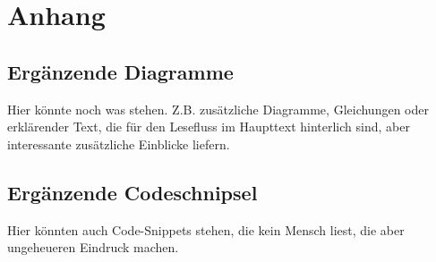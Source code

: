 \chapter{Anhang}

\section{Ergänzende Diagramme}
\label{Anhang_Diagramme}

Hier könnte noch was stehen. Z.B. zusätzliche Diagramme, Gleichungen
oder erklärender Text, die für den Lesefluss im Haupttext hinterlich
sind, aber interessante zusätzliche Einblicke liefern.

\section{Ergänzende Codeschnipsel}
\label{Anhang_Code}

Hier könnten auch Code-Snippets stehen, die kein Mensch liest, die
aber ungeheueren Eindruck machen.
